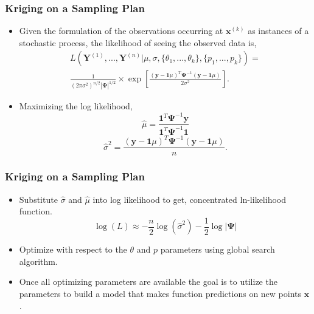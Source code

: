 \begin{frame}
\frametitle{Kriging on a Sampling Plan}

\begin{itemize}
  \item Given the formulation of the observations occurring at $\textbf{x}^{(k)}$ as instances of a stochastic process, the likelihood of seeing the observed data is,
\begin{eqnarray}
   L\left(\textbf{Y}^{(1)}, ..., \textbf{Y}^{(n)} | 
    \mu, \sigma, \lbrace \theta_1,..., \theta_k\rbrace, 
    \lbrace p_1,..., p_k\rbrace\right) = \nonumber \\
     \frac{1}{\left(2\pi\sigma^2\right)^{n/2}|\boldsymbol{\Psi}|^{1/2}}\times
     \exp\left[\frac{  \left(\textbf{y}-\textbf{1}\mu\right)^T
    \boldsymbol{\Psi}^{-1} \left(\textbf{y}-\textbf{1}\mu\right)}
    {2\sigma^2} \right] . \nonumber
\end{eqnarray} 
  \item Maximizing the log likelihood, 
   \begin{equation}
   	\hat{\mu} = \frac{ \textbf{1}^T\boldsymbol{\Psi}^{-1}\textbf{y} }
    		 	    {  \textbf{1}^T\boldsymbol{\Psi}^{-1}\textbf{1} } \nonumber
   \end{equation}
   \begin{equation}
   	\hat{\sigma}^2 = \frac{  \left(\textbf{y}-\textbf{1}\mu\right)^T
    			\boldsymbol{\Psi}^{-1} \left(\textbf{y}-\textbf{1}\mu\right)}{n}. \nonumber
   \end{equation}
\end{itemize}

\end{frame}
\begin{frame}
\frametitle{Kriging on a Sampling Plan}

\begin{itemize}
  \item Substitute $\hat{\sigma}$ and $\hat{\mu}$ into log likelihood to get, concentrated ln-likelihood function.
   \begin{equation}
    \log(L) \approx -\frac{n}{2}\log\left(\hat{\sigma}^2\right) -
     \frac{1}{2} \log|\boldsymbol{\Psi}| \nonumber	
   \end{equation}
  \item Optimize with respect to the $\theta$ and $p$ parameters using global search algorithm.
  \item Once all optimizing parameters are available the goal is to utilize the parameters to build a model that makes function predictions on new points $\textbf{x}$.
\end{itemize}

\end{frame}

